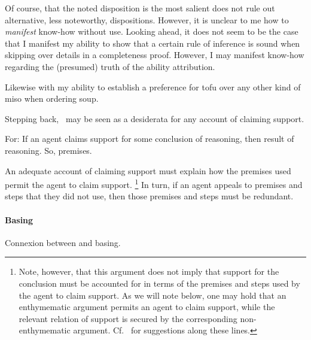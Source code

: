 \begin{note}
  Of course, that the noted disposition is the most salient does not rule out alternative, less noteworthy, dispositions.
  However, it is unclear to me how to \emph{manifest} know-how without use.
  Looking ahead, it does not seem to be the case that I manifest my ability to show that a certain rule of inference is sound when skipping over details in a completeness proof.
  However, I may manifest know-how regarding the (presumed) truth of the ability attribution.

  Likewise with my ability to establish a preference for tofu over any other kind of miso when ordering soup.
\end{note}

\begin{note}
  Stepping back,~\ESU{} may be seen as a desiderata for any account of claiming support.

  For:
  If an agent claims support for some conclusion of reasoning, then result of reasoning.
  So, premises.

  An adequate account of claiming support must explain how the premises used permit the agent to claim support.\nolinebreak
  \footnote{
    Note, however, that this argument does not imply that support for the conclusion must be accounted for in terms of the premises and steps used by the agent to claim support.
    As we will note below, one may hold that an enthymematic argument permits an agent to claim support, while the relevant relation of support is secured by the corresponding non-enthymematic argument.
    Cf.\ \textcite{Moretti:2019wx} for suggestions along these lines.
  }
  In turn, if an agent appeals to premises and steps that they did not use, then those premises and steps must be redundant.
\end{note}


\paragraph{Basing}

\begin{note}
  Connexion between \ESU{} and basing.
\end{note}

